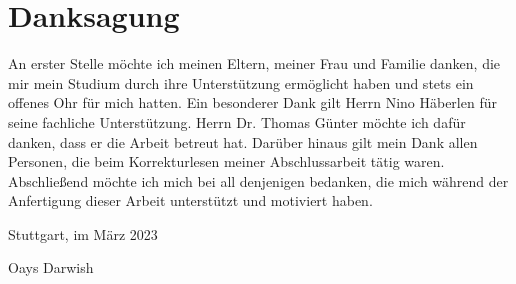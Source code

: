 \chapter*{Danksagung}
An erster Stelle möchte ich meinen Eltern, meiner Frau und Familie danken, die mir mein Studium durch ihre Unterstützung ermöglicht haben und stets ein offenes Ohr für mich hatten. Ein besonderer Dank gilt Herrn Nino Häberlen für seine fachliche Unterstützung. Herrn Dr. Thomas Günter möchte ich dafür danken, dass er die Arbeit betreut hat. Darüber hinaus gilt mein Dank allen Personen, die beim Korrekturlesen meiner Abschlussarbeit tätig waren. Abschließend möchte ich mich bei all denjenigen bedanken, die mich während der Anfertigung dieser Arbeit unterstützt und motiviert haben.


\vspace{1.3cm}
Stuttgart, im März 2023

\vspace{1.6cm}
Oays Darwish